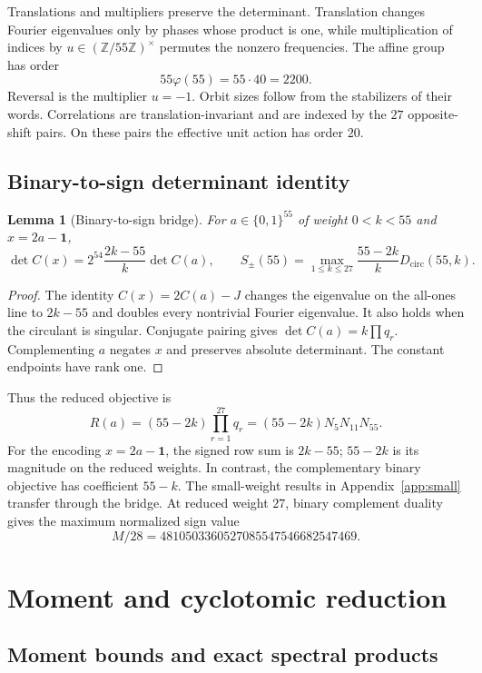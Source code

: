 \documentclass[11pt,a4paper]{article}
\newtheorem{lemma}{Lemma}
\theoremstyle{remark}
\newcommand{\Z}{\mathbb Z}
\begin{document}
Translations and multipliers preserve the determinant.  Translation changes
Fourier eigenvalues only by phases whose product is one, while multiplication
of indices by $u\in(\Z/55\Z)^\times$ permutes the nonzero frequencies.  The
affine group has order
\[
  55\varphi(55)=55\cdot40=2200.
\]
Reversal is the multiplier $u=-1$.  Orbit sizes follow from the stabilizers of their words.
Correlations are translation-invariant and are indexed
by the $27$ opposite-shift pairs.  On these pairs the effective unit action
has order $20$.


\subsection{Binary-to-sign determinant identity}

\begin{lemma}[Binary-to-sign bridge]\label{lem:sign-bridge}
For $a\in\{0,1\}^{55}$ of weight $0<k<55$ and $x=2a-\mathbf1$,
\[
 \det C(x)=2^{54}\frac{2k-55}{k}\det C(a),\qquad
 S_{\pm}(55)=\max_{1\le k\le27}\frac{55-2k}{k}D_{\mathrm{circ}}(55,k).
\]
\end{lemma}
\begin{proof}
The identity $C(x)=2C(a)-J$ changes the eigenvalue on the all-ones
line to $2k-55$ and doubles every nontrivial Fourier eigenvalue.
It also holds when the circulant is singular. Conjugate pairing gives
$\det C(a)=k\prod q_r$. Complementing $a$ negates $x$ and preserves
absolute determinant. The constant endpoints have rank one.
\end{proof}
Thus the reduced objective is
\[
 R(a)=(55-2k)\prod_{r=1}^{27}q_r=(55-2k)N_5N_{11}N_{55}.
\]
For the encoding $x=2a-\mathbf1$, the signed row sum is $2k-55$;
$55-2k$ is its magnitude on the reduced weights.
In contrast, the complementary binary objective has coefficient $55-k$.
The small-weight results in Appendix~\ref{app:small}
transfer through the bridge. At reduced weight $27$, binary complement duality gives
the maximum normalized sign value
\[
 M/28=4810503360527085547546682547469.
\]



\section{Moment and cyclotomic reduction}
\label{sec:reduction}

\subsection{Moment bounds and exact spectral products}
\end{document}
